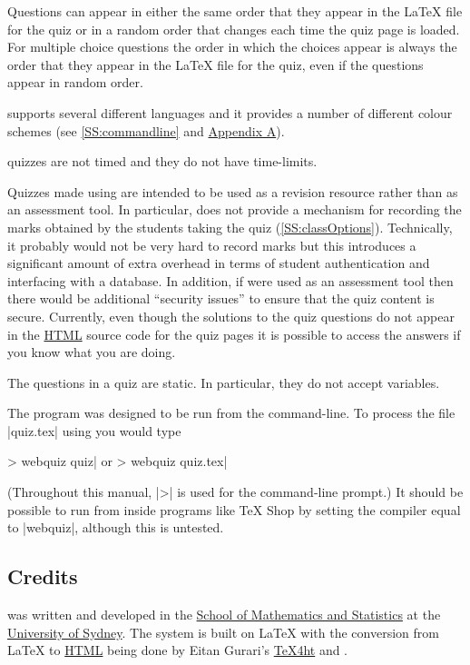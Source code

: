 \documentclass[svgnames]{article}
\newcommand\TeXfht{\href{https://www.ctan.org/tex4ht}{TeX4ht}\xspace}
\newcommand{\HTML}{\href{https://www.w3schools.com/html/html_intro.asp}{HTML}\xspace}
\begin{document}
      Questions can appear in either the same order that they appear in
      the \LaTeX{} file for the quiz or in a random order that changes
      each time the quiz page is loaded. For multiple choice questions the
      order in which the choices appear is always the order that they
      appear in the \LaTeX{} file for the quiz, even if the questions
      appear in random order.

      \WebQuiz supports several different languages and it
      provides a number of different colour schemes (see
      \autoref{SS:commandline} and \hyperref[SS:themes]{Appendix A}).

      \WebQuiz quizzes are not timed and they do not have time-limits.

      Quizzes made using \WebQuiz are intended to be used as a
      revision resource rather than as an assessment tool. In particular,
      \WebQuiz does not provide a mechanism for recording the marks
      obtained by the students taking the quiz
      (\autoref{SS:classOptions}). Technically, it probably would not be
      very hard to record marks but this introduces a significant amount
      of extra overhead in terms of student authentication and interfacing
      with a database. In addition, if \WebQuiz were used as an assessment
      tool then there would be additional ``security issues'' to ensure
      that the quiz content is secure. Currently, even though the
      solutions to the quiz questions do not appear in the \HTML source
      code for the quiz pages it is possible to access the answers if you
      know what you are doing.

      The questions in a \WebQuiz quiz are static. In particular, they do
      not accept variables.

      The \WebQuiz program was designed to be run from the command-line.
      To process the file \BashCode|quiz.tex| using \WebQuiz you would
      type
      \begin{bashcode}
      > webquiz quiz|         or         > webquiz quiz.tex|
      \end{bashcode}
      (Throughout this manual, \BashCode|>| is used for the command-line
      prompt.) 
      It should be possible to run \WebQuiz from inside programs like \TeX
      Shop by setting the compiler equal to \BashCode|webquiz|, although
      this is untested.

  \subsection{Credits}
      \WebQuiz{} was written and developed in the
      \href{http://www.maths.usyd.edu.au/}{School of Mathematics and
      Statistics} at the \href{http://www.usyd.edu.au/}{University of
      Sydney}.  The system is built on \LaTeX{} with the conversion from
      \LaTeX{} to \HTML being done by Eitan Gurari's
      \TeXfht and .
\end{document}
